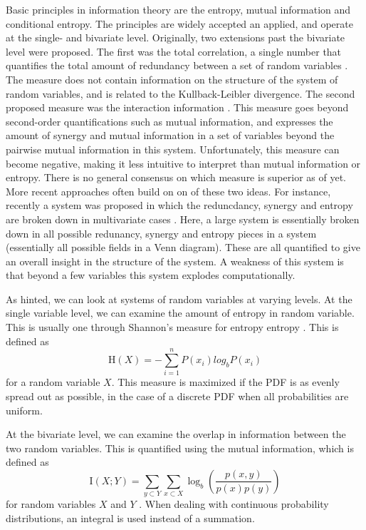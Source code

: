 \documentclass[../main.tex]{subfiles}
\begin{document}
Basic principles in information theory are the entropy, mutual information and conditional entropy.
The principles are widely accepted an applied, and operate at the single- and bivariate level.
Originally, two extensions past the bivariate level were proposed.
The first was the total correlation, a single number that quantifies the total amount of redundancy between a set of random variables \cite{watanabe1960information}. 
The measure does not contain information on the structure of the system of random variables, and is related to the Kullback-Leibler divergence.
The second proposed measure was the interaction information \cite{mcgill1954multivariate}. This measure goes beyond second-order quantifications such as mutual information, and expresses the amount of synergy and mutual information in a set of variables beyond the pairwise mutual information in this system. 
Unfortunately, this measure can become negative, making it less intuitive to interpret than mutual information or entropy.
There is no general consensus on which measure is superior as of yet\cite{williams2010nonnegative}.
More recent approaches often build on on of these two ideas.
For instance, recently a system was proposed in which the reduncdancy, synergy and entropy are broken down in multivariate cases \cite{williams2010nonnegative}.
Here, a large system is essentially broken down in all possible redunancy, synergy and entropy pieces in a system (essentially all possible fields in a Venn diagram).
These are all quantified to give an overall insight in the structure of the system.
A weakness of this system is that beyond a few variables this system explodes computationally.

As hinted, we can look at systems of random variables at varying levels.
At the single variable level, we can examine the amount of entropy in random variable.
This is usually one through Shannon's measure for entropy entropy \cite{shannon1949mathematical}.
This is defined as 
%
\begin{equation}
\mathrm{H}(X) = -\sum^n_{i=1} P(x_i) log_b P(x_i)
\end{equation}
%
for a random variable $X$. 
This measure is maximized if the PDF is as evenly spread out as possible, in the case of a discrete PDF when all probabilities are uniform.

At the bivariate level, we can examine the overlap in information between the two random variables.
This is quantified using the mutual information, which is defined as 
%
\begin{equation}
\mathrm{I}(X;Y) = \sum_{y \subset Y} \sum_{x \subset X} \log_b (\frac{p(x,y)}{p(x) p(y)})
\end{equation}
%
for random variables $X$ and $Y$ \cite{cover2012elements}.
When dealing with continuous probability distributions, an integral is used instead of a summation.
\end{document}
